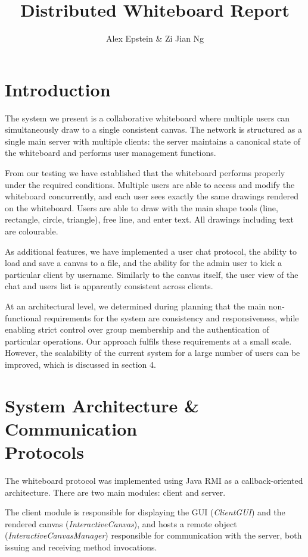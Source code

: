 \documentclass[12pt,a4paper]{article}
\title{Distributed Whiteboard Report}
\author{Alex Epstein \& Zi Jian Ng}
\begin{document}
\maketitle


\section{Introduction}

The system we present is a collaborative whiteboard where multiple users can simultaneously draw to a single consistent canvas. The network is structured as a single main server with multiple clients: the server maintains a canonical state of the whiteboard and performs user management functions.

From our testing we have established that the whiteboard performs properly under the required conditions. Multiple users are able to access and modify the whiteboard concurrently, and each user sees exactly the same drawings rendered on the whiteboard. Users are able to draw with the main shape tools (line, rectangle, circle, triangle), free line, and enter text. All drawings including text are colourable. 

As additional features, we have implemented a user chat protocol, the ability to load and save a canvas to a file, and the ability for the admin user to kick a particular client by username. Similarly to the canvas itself, the user view of the chat and users list is apparently consistent across clients. 

At an architectural level, we determined during planning that the main non-functional requirements for the system are consistency and responsiveness, while enabling strict control over group membership and the authentication of particular operations. Our approach fulfils these requirements at a small scale. However, the scalability of the current system for a large number of users can be improved, which is discussed in section 4.

\section{System Architecture \& Communication \\Protocols}

The whiteboard protocol was implemented using Java RMI as a callback-oriented architecture. There are two main modules: client and server. 

The client module is responsible for displaying the GUI (\textit{ClientGUI}) and the rendered canvas (\textit{InteractiveCanvas}), and hosts a remote object (\textit{InteractiveCanvasManager}) responsible for communication with the server, both issuing and receiving method invocations. 
\end{document}

